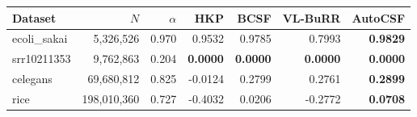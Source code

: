 \begin{tabular}{lrrrrrr}
Dataset & $N$ & $\alpha$ & HKP & BCSF & VL-BuRR & AutoCSF \\
\hline
ecoli\_sakai & 5,326,526 & 0.970 & 0.9532 & 0.9785 & 0.7993 & \textbf{0.9829} \\
srr10211353 & 9,762,863 & 0.204 & \textbf{0.0000} & \textbf{0.0000} & \textbf{0.0000} & \textbf{0.0000} \\
celegans & 69,680,812 & 0.825 & -0.0124 & 0.2799 & 0.2761 & \textbf{0.2899} \\
rice & 198,010,360 & 0.727 & -0.4032 & 0.0206 & -0.2772 & \textbf{0.0708} \\
\end{tabular}
